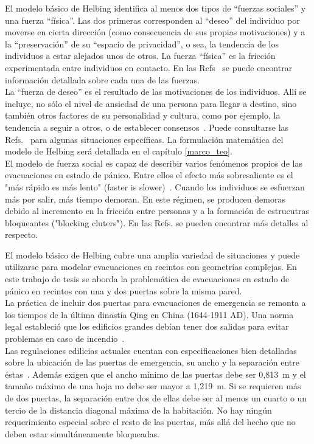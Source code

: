 \noindent El modelo básico de Helbing identifica al menos dos tipos de “fuerzas sociales” y una fuerza “física”.  Las dos primeras corresponden al “deseo” del individuo por moverse en cierta dirección (como consecuencia de sus propias motivaciones) y a la “preservación” de su “espacio de privacidad”, o sea, la tendencia de los individuos a estar alejados unos de otros. La fuerza “física” es la  fricción experimentada entre individuos en contacto. En las Refs~\cite{Helbing1,Dorso1,Dorso3} se puede encontrar información detallada sobre cada una de las fuerzas.\\ 

\noindent La “fuerza de deseo” es el resultado de las motivaciones de los individuos. Allí se incluye, no sólo el nivel de ansiedad de una persona para llegar a destino, sino también otros factores de su personalidad y cultura, como por ejemplo, la tendencia a seguir a otros, o de establecer consensos~\cite{Dorso3,Dorso4}.  Puede consultarse las Refs.~\cite{Wang,low} para algunas situaciones específicas. 
La formulación matemática del modelo de Helbing será detallada en el capítulo \ref{marco_teo}. \\ 

El modelo de fuerza social es capaz de describir varios fenómenos propios de las evacuaciones en estado de pánico. Entre ellos el efecto más sobresaliente es el "más rápido es más lento" (faster is slower)~\cite{Helbing1}. Cuando los individuos se esfuerzan más por salir, más tiempo demoran. En este régimen, se producen demoras debido al incremento en la fricción entre personas y a la formación de estrucutras bloqueantes ("blocking cluters"). En las Refs. \cite{Dorso1} se pueden encontrar más detalles al respecto.

\noindent El modelo básico de Helbing cubre una amplia variedad de situaciones y puede utilizarse para modelar evacuaciones en recintos con geometrías complejas. En este trabajo de tesis se aborda la problemática de evacuaciones en estado de pánico en recintos con una y dos puertas sobre la misma pared.\\ 

\noindent La práctica de incluir dos puertas para evacuaciones de emergencia se remonta a los tiempos de la última dinastía Qing en China (1644-1911 AD). Una norma legal estableció que los edificios grandes debían tener dos salidas para evitar problemas en caso de incendio~\cite{cheng}.\\

Las regulaciones edilicias actuales cuentan con especificaciones bien detalladas sobre la ubicación de las puertas de emergencia, su ancho y la separación entre éstas~\cite{OSHA,FLO}. Además exigen que el ancho mínimo de las puertas debe ser 0,813~m y el tamaño máximo de una hoja no debe ser mayor a 1,219~m\cite{FLO,FLO2}. Si se requieren más de dos puertas, la separación entre dos de ellas debe ser al menos un cuarto o un tercio de la distancia diagonal máxima de la habitación. No hay ningún requerimiento especial sobre el resto de las puertas, más allá del hecho que no deben estar simultáneamente bloqueadas\cite{FLO,FLO2}.\\

